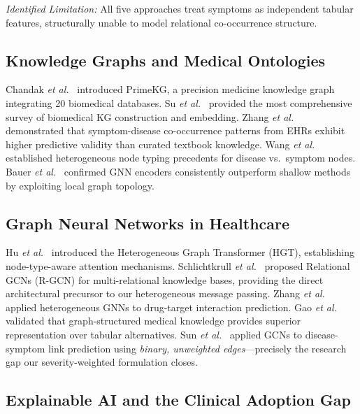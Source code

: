\documentclass[conference]{IEEEtran}
\begin{document}
\noindent\textit{Identified Limitation:} All five approaches treat
symptoms as independent tabular features, structurally unable to model
relational co-occurrence structure.

\subsection{Knowledge Graphs and Medical Ontologies}

Chandak \textit{et al.}~\cite{chandak2023building} introduced PrimeKG,
a precision medicine knowledge graph integrating 20 biomedical
databases. Su \textit{et al.}~\cite{su2023comprehensive} provided the
most comprehensive survey of biomedical KG construction and embedding.
Zhang \textit{et al.}~\cite{zhang2022symptom} demonstrated that
symptom-disease co-occurrence patterns from EHRs exhibit higher
predictive validity than curated textbook knowledge. Wang \textit{et
al.}~\cite{wang2023clinical} established heterogeneous node typing
precedents for disease vs.\ symptom nodes. Bauer \textit{et
al.}~\cite{bauer2023benchmarking} confirmed GNN encoders consistently
outperform shallow methods by exploiting local graph topology.

\subsection{Graph Neural Networks in Healthcare}

Hu \textit{et al.}~\cite{hu2020heterogeneous} introduced the
Heterogeneous Graph Transformer (HGT), establishing node-type-aware
attention mechanisms. Schlichtkrull \textit{et
al.}~\cite{schlichtkrull2018modeling} proposed Relational GCNs (R-GCN)
for multi-relational knowledge bases, providing the direct architectural
precursor to our heterogeneous message passing. Zhang \textit{et
al.}~\cite{zhang2022heterogeneous} applied heterogeneous GNNs to
drug-target interaction prediction. Gao \textit{et
al.}~\cite{gao2021medpath} validated that graph-structured medical
knowledge provides superior representation over tabular alternatives.
Sun \textit{et al.}~\cite{sun2021disease} applied GCNs to
disease-symptom link prediction using \textit{binary, unweighted
edges}---precisely the research gap our severity-weighted formulation
closes.

\subsection{Explainable AI and the Clinical Adoption Gap}
\end{document}
